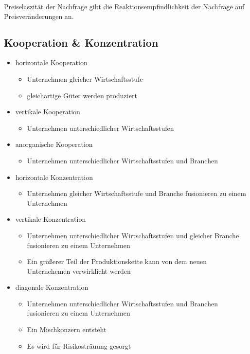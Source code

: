 \noindent Preiselaszität der Nachfrage gibt die Reaktionsempfindlichkeit der Nachfrage auf Preisveränderungen an.


\subsection{Kooperation \& Konzentration}

\begin{itemize}
	\item horizontale Kooperation
		\begin{itemize}
			\item Unternehmen gleicher Wirtschaftsstufe
			\item gleichartige Güter werden produziert
		\end{itemize}
	\item vertikale Kooperation
		\begin{itemize}
			\item Unternehmen unterschiedlicher Wirtschaftsstufen
		\end{itemize}
	\item anorganische Kooperation
		\begin{itemize}
			\item Unternehmen unterschiedlicher Wirtschaftsstufen und Branchen
		\end{itemize}
\end{itemize}

\begin{itemize}
	\item horizontale Konzentration
		\begin{itemize}
			\item Unternehmen gleicher Wirtschaftsstufe und Branche fusionieren zu einem Unternehmen
		\end{itemize}
	\item vertikale Konzentration
		\begin{itemize}
			\item Unternehmen unterschiedlicher Wirtschaftsstufen und gleicher Branche fusionieren zu einem Unternehmen
			\item Ein größerer Teil der Produktionskette kann von dem neuen Unternehemen verwirklicht werden
		\end{itemize}
	\item diagonale Konzentration
		\begin{itemize}
			\item Unternehmen unterschiedlicher Wirtschaftsstufen und Branchen fusionieren zu einem Unternehmen
			\item Ein Mischkonzern entsteht
			\item Es wird für Risikosträuung gesorgt
		\end{itemize}
\end{itemize}

